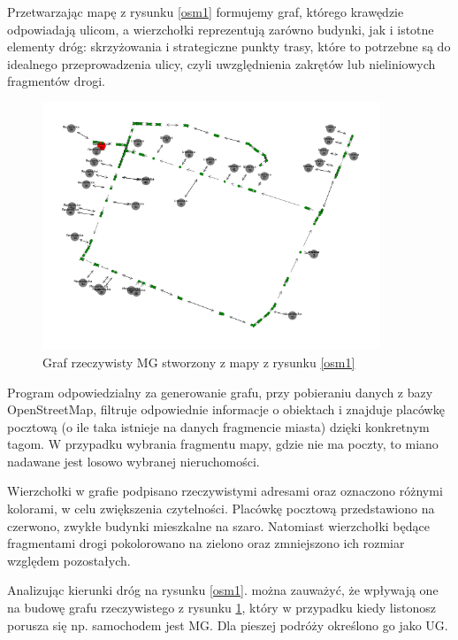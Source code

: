 \documentclass[a4paper, 12pt, twoside, openright]{article}
\begin{document}

Przetwarzając mapę z rysunku \ref{osm1} formujemy graf, którego krawędzie odpowiadają ulicom, a wierzchołki reprezentują zarówno budynki, jak i istotne elementy dróg: skrzyżowania i strategiczne punkty trasy, które to potrzebne są do idealnego przeprowadzenia ulicy, czyli uwzględnienia zakrętów lub nieliniowych fragmentów drogi.

\begin{figure}[htb]
	\centering
	\includegraphics[width=0.9\textwidth]{OSM1graf}
	\caption[]{Graf rzeczywisty MG stworzony z mapy z rysunku \ref{osm1}}
	\label{osm1G}
\end{figure}

Program odpowiedzialny za generowanie grafu, przy pobieraniu danych z bazy OpenStreetMap, filtruje odpowiednie informacje o obiektach i znajduje placówkę pocztową (o ile taka istnieje na danych fragmencie miasta) dzięki konkretnym tagom\cite{osmPropertis}. W przypadku wybrania fragmentu mapy, gdzie nie ma poczty, to miano nadawane jest losowo wybranej nieruchomości.

Wierzchołki w grafie podpisano rzeczywistymi adresami oraz oznaczono różnymi kolorami, w celu zwiększenia czytelności. Placówkę pocztową przedstawiono na czerwono, zwykłe budynki mieszkalne na szaro. Natomiast wierzchołki będące fragmentami drogi pokolorowano na zielono oraz zmniejszono ich rozmiar względem pozostałych.

Analizując kierunki dróg na rysunku \ref{osm1}. można zauważyć, że wpływają one na budowę grafu rzeczywistego z rysunku \ref{osm1G}, który w przypadku kiedy listonosz porusza się np. samochodem jest MG. Dla pieszej podróży  określono go jako UG.
\end{document}
